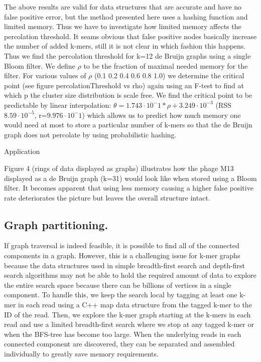 \documentclass[12pt]{article} \usepackage{simplemargins}
\begin{document}
The above results are valid for data structures that are accurate and have no false positive error,
but the method presented here uses a hashing function and limited memory. Thus we have to investigate
how limited memory affects the percolation threshold. It seams obvious that false positive nodes 
basically increase the number of added k-mers, still it is not clear in which fashion this happens.
Thus we find the percolation threshold for k=12 de Bruijn graphs using a single Bloom filter. We define
$\rho$ to be the fraction of maximal needed memory for the filter. For various values of $\rho$ (0.1 0.2 0.4 0.6 0.8 1.0)
we determine the critical point (see figure percolationThreshold vs rho) again using an F-test to find
at which p the cluster size distribution is scale free. We find the critical point to be predictable
by linear interpolation:
$\theta = 1.743 \cdot 10^-1 * \rho + 3.249 \cdot 10^{-3}$ (RSS $8.59 \cdot 10^{-5}$, r=$9.976 \cdot 10^-1$)
which allows us to predict how much memory one would need at most to store a particular number of k-mers
so that the de Bruijn graph does not percolate by using probabilistic hashing.

Application

Figure 4 (rings of data displayed as graphs) illustrates how the phage M13 displayed as a de Bruijn graph (k=31) would look like when stored using a Bloom filter. It becomes apparent that using less memory causing a higher false positive rate deteriorates the picture but leaves the overall structure intact.

\subsection{Graph partitioning.}
If graph traversal is indeed feasible, it is possible to find all of
the connected components in a graph. However, this is a challenging
issue for k-mer graphs because the data structures used in simple
breadth-first search and depth-first search algorithms may not be able
to hold the required amount of data to explore the entire search space
because there can be billions of vertices in a single component. To
handle this, we keep the search local by tagging at least one k-mer in
each read using a C++ map data structure from the tagged k-mer to the
ID of the read. Then, we explore the k-mer graph starting at the
k-mers in each read and use a limited breadth-first search where we
stop at any tagged k-mer or when the BFS-tree has become too
large. When the underlying reads in each connected component are
discovered, they can be separated and assembled individually to
greatly save memory requirements.
\end{document}

